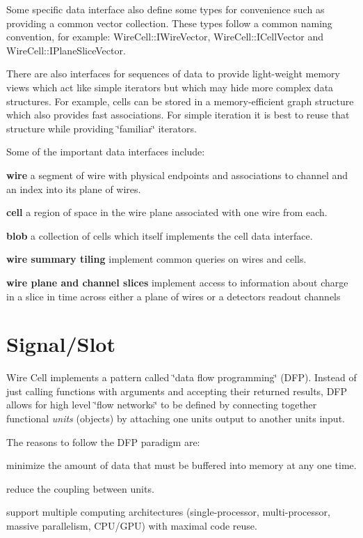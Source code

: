 Some specific data interface also define some types for convenience such as providing a common vector collection. These types follow a common naming convention, for example\+: {\ttfamily Wire\+Cell\+::\+I\+Wire\+Vector}, {\ttfamily Wire\+Cell\+::\+I\+Cell\+Vector} and {\ttfamily Wire\+Cell\+::\+I\+Plane\+Slice\+Vector}.

There are also interfaces for sequences of data to provide light-\/weight memory views which act like simple iterators but which may hide more complex data structures. For example, cells can be stored in a memory-\/efficient graph structure which also provides fast associations. For simple iteration it is best to reuse that structure while providing \char`\"{}familiar\char`\"{} iterators.

Some of the important data interfaces include\+:


\begin{DoxyItemize}
\item {\bfseries wire} a segment of wire with physical endpoints and associations to channel and an index into its plane of wires.
\item {\bfseries cell} a region of space in the wire plane associated with one wire from each.
\item {\bfseries blob} a collection of cells which itself implements the cell data interface.
\item {\bfseries wire summary tiling} implement common queries on wires and cells.
\item {\bfseries wire plane and channel slices} implement access to information about charge in a slice in time across either a plane of wires or a detectors readout channels
\end{DoxyItemize}

\section*{Signal/\+Slot }

Wire Cell implements a pattern called \char`\"{}data flow programming\char`\"{} (D\+FP). Instead of just calling functions with arguments and accepting their returned results, D\+FP allows for high level \char`\"{}flow networks\char`\"{} to be defined by connecting together functional {\itshape units} (objects) by attaching one unit\textquotesingle{}s output to another unit\textquotesingle{}s input.

The reasons to follow the D\+FP paradigm are\+:


\begin{DoxyItemize}
\item minimize the amount of data that must be buffered into memory at any one time.
\item reduce the coupling between units.
\item support multiple computing architectures (single-\/processor, multi-\/processor, massive parallelism, C\+P\+U/\+G\+PU) with maximal code reuse.
\end{DoxyItemize}

